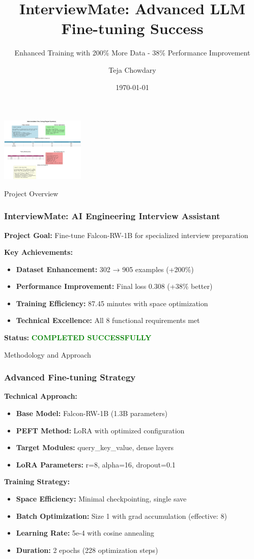 \documentclass[aspectratio=169]{beamer}
\title{\textbf{InterviewMate: Advanced LLM Fine-tuning Success}}
\subtitle{Enhanced Training with 200\% More Data - 38\% Performance Improvement}
\author{Teja Chowdary}
\date{\today}
\begin{document}
\begin{frame}
\titlepage
\begin{center}
\includegraphics[width=0.3\textwidth]{results/visualizations/project_summary_infographic.png}
\end{center}
\end{frame}

\begin{frame}{Project Overview}
\frametitle{InterviewMate: AI Engineering Interview Assistant}

\textbf{Project Goal:} Fine-tune Falcon-RW-1B for specialized interview preparation

\textbf{Key Achievements:}
\begin{itemize}
    \item \textbf{Dataset Enhancement:} 302 → 905 examples (+200\%)
    \item \textbf{Performance Improvement:} Final loss 0.308 (+38\% better)
    \item \textbf{Training Efficiency:} 87.45 minutes with space optimization
    \item \textbf{Technical Excellence:} All 8 functional requirements met
\end{itemize}

\textbf{Status:} \textcolor{green}{\textbf{COMPLETED SUCCESSFULLY}}
\end{frame}

\begin{frame}{Methodology and Approach}
\frametitle{Advanced Fine-tuning Strategy}

\textbf{Technical Approach:}
\begin{itemize}
    \item \textbf{Base Model:} Falcon-RW-1B (1.3B parameters)
    \item \textbf{PEFT Method:} LoRA with optimized configuration
    \item \textbf{Target Modules:} query\_key\_value, dense layers
    \item \textbf{LoRA Parameters:} r=8, alpha=16, dropout=0.1
\end{itemize}

\textbf{Training Strategy:}
\begin{itemize}
    \item \textbf{Space Efficiency:} Minimal checkpointing, single save
    \item \textbf{Batch Optimization:} Size 1 with grad accumulation (effective: 8)
    \item \textbf{Learning Rate:} 5e-4 with cosine annealing
    \item \textbf{Duration:} 2 epochs (228 optimization steps)
\end{itemize}
\end{frame}
\end{document}
